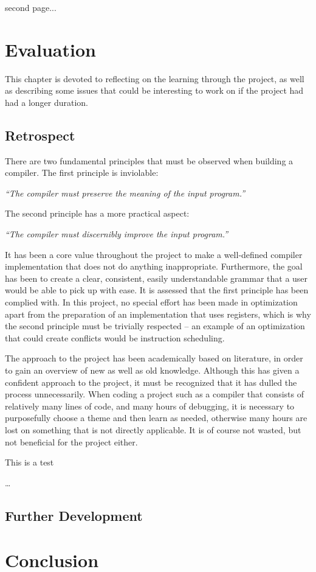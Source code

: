 second page...


\chapter{Evaluation}
This chapter is devoted to reflecting on the learning through the project, as well as describing some issues that could be interesting to work on if the project had had a longer duration.

\section{Retrospect}
There are two fundamental principles that must be observed when building a compiler. The first principle is inviolable:

\begin{displayquote}
    \textit{``The compiler must preserve the meaning of the input program.''}
\end{displayquote}
\hspace*{}

The second principle has a more practical aspect:

\begin{displayquote}
    \textit{``The compiler must discernibly improve the input program.''}
\end{displayquote}
\hspace*{}

It has been a core value throughout the project to make a well-defined compiler implementation that does not do anything inappropriate. Furthermore, the goal has been to create a clear, consistent, easily understandable grammar that a user would be able to pick up with ease. It is assessed that the first principle has been complied with. In this project, no special effort has been made in optimization apart from the preparation of an implementation that uses registers, which is why the second principle must be trivially respected -- an example of an optimization that could create conflicts would be instruction scheduling.

The approach to the project has been academically based on literature, in order to gain an overview of new as well as old knowledge. Although this has given a confident approach to the project, it must be recognized that it has dulled the process unnecessarily. When coding a project such as a compiler that consists of relatively many lines of code, and many hours of debugging, it is necessary to purposefully choose a theme and then learn as needed, otherwise many hours are lost on something that is not directly applicable. It is of course not wasted, but not beneficial for the project either.

This is a test

\dots{}

\section{Further Development}
 
\chapter{Conclusion}

\cleardoublepage
{}
{}
\printbibliography

